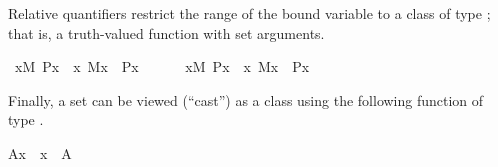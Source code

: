 %
%
Relative quantifiers restrict the range of the bound variable to a
class  of type ; that is, a truth-valued function with
set arguments.%
\begin{isabelle}
\isamarkupfalse%
\ {\isachardoublequoteopen}{\isasymforall}x{\isacharbrackleft}{\kern0pt}M{\isacharbrackright}{\kern0pt}{\isachardot}{\kern0pt}\ P{\isacharparenleft}{\kern0pt}x{\isacharparenright}{\kern0pt}\ {\isasymequiv}\ {\isasymforall}x{\isachardot}{\kern0pt}\ M{\isacharparenleft}{\kern0pt}x{\isacharparenright}{\kern0pt}\ {\isasymlongrightarrow}\ P{\isacharparenleft}{\kern0pt}x{\isacharparenright}{\kern0pt}{\isachardoublequoteclose}\isanewline
\ \ \ \ \ \ {\isachardoublequoteopen}{\isasymexists}x{\isacharbrackleft}{\kern0pt}M{\isacharbrackright}{\kern0pt}{\isachardot}{\kern0pt}\ P{\isacharparenleft}{\kern0pt}x{\isacharparenright}{\kern0pt}\ {\isasymequiv}\ {\isasymexists}x{\isachardot}{\kern0pt}\ M{\isacharparenleft}{\kern0pt}x{\isacharparenright}{\kern0pt}\ {\isasymand}\ P{\isacharparenleft}{\kern0pt}x{\isacharparenright}{\kern0pt}{\isachardoublequoteclose}
\end{isabelle}
%
%
Finally, a set can be viewed (“cast”) as a class using the
following function of type .%
\begin{isabelle}%
{\isacharparenleft}{\kern0pt}{\isacharhash}{\kern0pt}{\isacharhash}{\kern0pt}A{\isacharparenright}{\kern0pt}{\isacharparenleft}{\kern0pt}x{\isacharparenright}{\kern0pt}\ {\isasymlongleftrightarrow}\ x\ {\isasymin}\ A%
\end{isabelle}%
